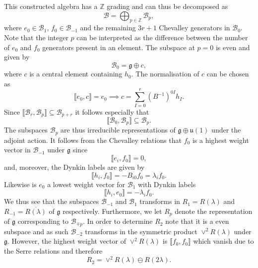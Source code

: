 This constructed algebra has a $\mathbb{Z}$ grading and can thus be decomposed as 
\begin{equation}
    \mathscr{B} = \bigoplus_{p\in\mathbb{Z}} \mathscr{B}_p,
\end{equation}
where $e_0\in\mathscr{B}_{1}$, $f_0\in\mathscr{B}_{-1}$ and the remaining $3r+1$ Chevalley generators in $\mathscr{B}_0$. Note that the integer $p$ can be interpreted as the difference between the number of $e_0$ and $f_0$ generators present in an element. The subspace at $p=0$ is even and given by 
\begin{equation}
    \mathscr{B}_0 = \mathfrak{g}\oplus c,
\end{equation}
where $c$ is a central element containing $h_0$. The normalisation of $c$ can be chosen as 
\begin{equation}
    \llbracket e_0,c \rrbracket = e_0 \implies c = \sum_{I=0}^r(B^{-1})^{0I}h_I.
\end{equation}
Since $\llbracket\mathscr{B}_r,\mathscr{B}_p\rrbracket \subseteq \mathscr{B}_{p+r}$ it follows especially that 
\begin{equation}
    \llbracket\mathscr{B}_0,\mathscr{B}_p\rrbracket \subseteq \mathscr{B}_p.
\end{equation}
The subspaces $\mathscr{B}_p$ are thus irreducible representations of $\mathfrak{g}\oplus \mathfrak{u}(1)$ under the adjoint action. It follows from the Chevalley relations that $f_0$ is a highest weight vector in $\mathscr{B}_{-1}$ under $\mathfrak{g}$ since 
\begin{equation}
    \llbracket e_i, f_0\rrbracket = 0,
\end{equation}
and, moreover, the Dynkin labels are given by 
\begin{equation}
    \llbracket h_i,f_0\rrbracket = -B_{i0}f_0 = \lambda_if_0.
\end{equation}
Likewise is $e_0$ a lowest weight vector for $\mathscr{B}_1$ with Dynkin labels
\begin{equation}
    \llbracket h_i,e_0\rrbracket = -\lambda_if_0.
\end{equation}
We thus see that the subspaces $\mathscr{B}_{-1}$ and $\mathscr{B}_1$ transforms in $R_1=R(\lambda)$ and $R_{-1}=\overbar{R(\lambda)}$ of $\mathfrak{g}$ respectively. Furthermore, we let $R_{p}$ denote the representation of $\mathfrak{g}$ corresponding to $\mathscr{B}_{\mp p}$. In order to determine $R_2$ note that it is a even subspace and as such $\mathscr{B}_{-2}$ transforms in the symmetric product $\vee^2R(\lambda)$ under $\mathfrak{g}$. However, the highest weight vector of $\vee^2R(\lambda)$ is $\llbracket f_0,f_0\rrbracket$ which vanish due to the Serre relations and therefore 
\begin{equation}
    R_2 = \vee^2R(\lambda)\ominus R(2\lambda).
\end{equation}

